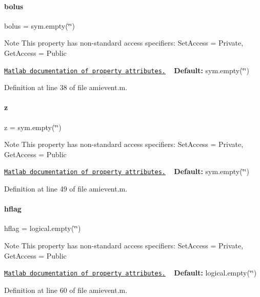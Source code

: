 \paragraph{\texorpdfstring{bolus}{bolus}}
{\footnotesize\ttfamily bolus = sym.\+empty(\char`\"{}\char`\"{})}

\begin{DoxyNote}{Note}
This property has non-\/standard access specifiers\+: {\ttfamily Set\+Access = Private, Get\+Access = Public} 

\href{http://www.mathworks.com/help/matlab/matlab_oop/property-attributes.html}{\tt Matlab documentation of property attributes.} ~\newline
{\bfseries Default\+:} sym.\+empty(\char`\"{}\char`\"{}) 
\end{DoxyNote}


Definition at line 38 of file amievent.\+m.

\mbox{\label{classamievent_a25ed1bcb423b0b7200f485fc5ff71c8e}} 
\paragraph{\texorpdfstring{z}{z}}
{\footnotesize\ttfamily z = sym.\+empty(\char`\"{}\char`\"{})}

\begin{DoxyNote}{Note}
This property has non-\/standard access specifiers\+: {\ttfamily Set\+Access = Private, Get\+Access = Public} 

\href{http://www.mathworks.com/help/matlab/matlab_oop/property-attributes.html}{\tt Matlab documentation of property attributes.} ~\newline
{\bfseries Default\+:} sym.\+empty(\char`\"{}\char`\"{}) 
\end{DoxyNote}


Definition at line 49 of file amievent.\+m.

\mbox{\label{classamievent_ab98347b5ce6fbe7bd007030346b88575}} 
\paragraph{\texorpdfstring{hflag}{hflag}}
{\footnotesize\ttfamily hflag = logical.\+empty(\char`\"{}\char`\"{})}

\begin{DoxyNote}{Note}
This property has non-\/standard access specifiers\+: {\ttfamily Set\+Access = Private, Get\+Access = Public} 

\href{http://www.mathworks.com/help/matlab/matlab_oop/property-attributes.html}{\tt Matlab documentation of property attributes.} ~\newline
{\bfseries Default\+:} logical.\+empty(\char`\"{}\char`\"{}) 
\end{DoxyNote}


Definition at line 60 of file amievent.\+m.

